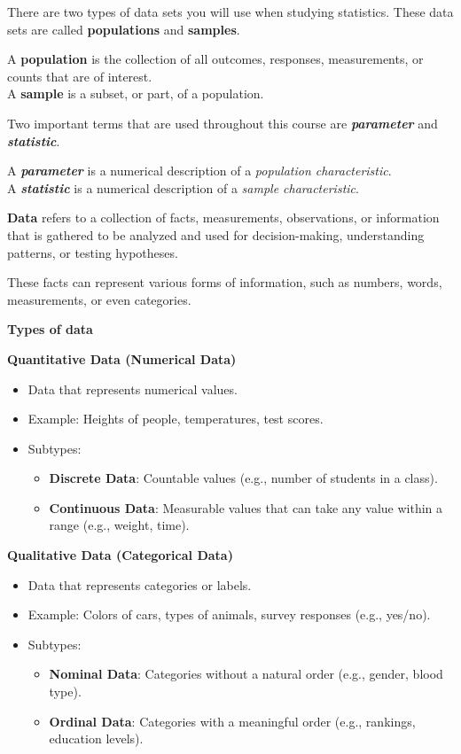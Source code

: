 \documentclass[
  11pt,
  letterpaper,
  DIV=11,
  numbers=noendperiod]{scrreprt}
\begin{document}
There are two types of data sets you will use when studying statistics.
These data sets are called \textbf{populations} and \textbf{samples}.

A \textbf{population} is the collection of all outcomes, responses,
measurements, or counts that are of interest.\\
A \textbf{sample} is a subset, or part, of a population.

Two important terms that are used throughout this course are
\textbf{\emph{parameter}} and \textbf{\emph{statistic}}.

A \textbf{\emph{parameter}} is a numerical description of a
\emph{population characteristic}.\\
A \textbf{\emph{statistic}} is a numerical description of a \emph{sample
characteristic}.

\textbf{Data} refers to a collection of facts, measurements,
observations, or information that is gathered to be analyzed and used
for decision-making, understanding patterns, or testing hypotheses.

These facts can represent various forms of information, such as numbers,
words, measurements, or even categories.

\textbf{Types of data}

\textbf{Quantitative Data (Numerical Data)}

\begin{itemize}
\item
  Data that represents numerical values.
\item
  Example: Heights of people, temperatures, test scores.
\item
  Subtypes:

  \begin{itemize}
  \item
    \textbf{Discrete Data}: Countable values (e.g., number of students
    in a class).
  \item
    \textbf{Continuous Data}: Measurable values that can take any value
    within a range (e.g., weight, time).
  \end{itemize}
\end{itemize}

\textbf{Qualitative Data (Categorical Data)}

\begin{itemize}
\item
  Data that represents categories or labels.
\item
  Example: Colors of cars, types of animals, survey responses (e.g.,
  yes/no).
\item
  Subtypes:

  \begin{itemize}
  \item
    \textbf{Nominal Data}: Categories without a natural order (e.g.,
    gender, blood type).
  \item
    \textbf{Ordinal Data}: Categories with a meaningful order (e.g.,
    rankings, education levels).
  \end{itemize}
\end{itemize}
\end{document}
